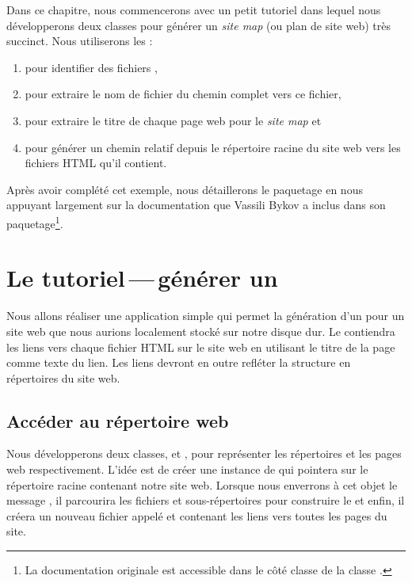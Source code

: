 \documentclass[a4paper,10pt,twoside]{book}
\begin{document}
Dans ce chapitre, nous commencerons avec un petit tutoriel dans lequel
nous développerons deux classes pour générer un \emph{site map} (ou
plan de site web) très succinct.
Nous utiliserons les \expregs:
\begin{enumerate}
\item pour identifier des fichiers ,
\item pour extraire
le nom de fichier du chemin complet vers ce fichier, 
\item pour extraire le titre de chaque page web pour le \emph{site
    map} et
\item pour générer un chemin relatif depuis le répertoire racine du
  site web vers les fichiers HTML qu'il contient.
\end{enumerate}
Après avoir complété cet exemple, nous détaillerons le paquetage
\pkgregex en nous appuyant largement sur la documentation que Vassili
Bykov a inclus dans son paquetage\footnote{La documentation originale
  est accessible dans le côté classe de la classe .}.

\section{Le tutoriel\,---\,générer un \sitemap}


Nous allons réaliser une application simple qui permet la génération
d'un \sitemap pour un site web que nous aurions localement stocké sur
notre disque dur. Le \sitemap contiendra les liens vers chaque fichier
HTML sur le site web en utilisant le titre de la page comme texte du
lien. Les liens devront en outre refléter la structure en répertoires
du site web.

\subsection{Accéder au répertoire web}


Nous développerons deux classes,  et , pour
représenter les répertoires et les pages web respectivement. L'idée
est de créer une instance de  qui pointera sur le
répertoire racine contenant notre site web. Lorsque nous enverrons à
cet objet le message , il parcourira les fichiers et
sous-répertoires pour construire le \sitemap et enfin, il créera un
nouveau fichier appelé  et contenant les liens vers
toutes les pages du site.
\end{document}
